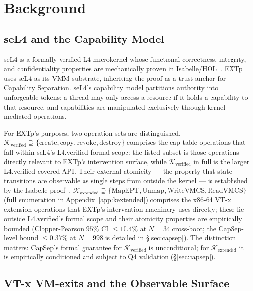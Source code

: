 \documentclass[conference]{IEEEtran}
\newcommand{\Kverified}{\mathcal{K}_\text{verified}}
\newcommand{\Kextended}{\mathcal{K}_\text{extended}}
\begin{document}
\section{Background}\label{sec:background}

\subsection{seL4 and the Capability Model}

seL4 is a formally verified L4 microkernel whose functional
correctness, integrity, and confidentiality properties are
mechanically proven in
Isabelle/HOL~\cite{klein2009sel4,klein2014sel4}. EXTp uses seL4 as
its VMM substrate, inheriting the proof as a trust anchor for
Capability Separation. seL4's capability model partitions authority
into unforgeable tokens: a thread may only access a resource if it
holds a capability to that resource, and capabilities are manipulated
exclusively through kernel-mediated operations.

For EXTp's purposes, two operation sets are distinguished.
$\Kverified \supseteq \{\text{create}, \text{copy}, \text{revoke},
\text{destroy}\}$ comprises the cap-table operations that fall
within seL4's L4.verified formal scope; the listed subset is
those operations directly relevant to EXTp's intervention surface,
while $\Kverified$ in full is the larger L4.verified-covered
API. Their external atomicity --- the property that state
transitions are observable as single steps from outside the
kernel --- is established by the Isabelle
proof~\cite{klein2009sel4}. $\Kextended \supseteq \{\text{MapEPT},
\text{Unmap}, \text{WriteVMCS}, \text{ReadVMCS}\}$ (full enumeration
in Appendix~\ref{app:kextended}) comprises the x86-64 VT-x extension
operations that EXTp's intervention machinery uses directly; these
lie outside L4.verified's formal scope and their atomicity properties
are empirically bounded (Clopper-Pearson $95\%$ CI $\leq 10.4\%$ at
$N{=}34$ cross-boot; the CapSep-level bound $\leq 0.37\%$ at $N{=}998$
is detailed in \S\ref{sec:capsep}). The distinction matters: CapSep's
formal guarantee for $\Kverified$ is unconditional; for $\Kextended$
it is empirically conditioned and subject to Q4 validation
(\S\ref{sec:capsep}).

\subsection{VT-x VM-exits and the Observable Surface}
\end{document}
